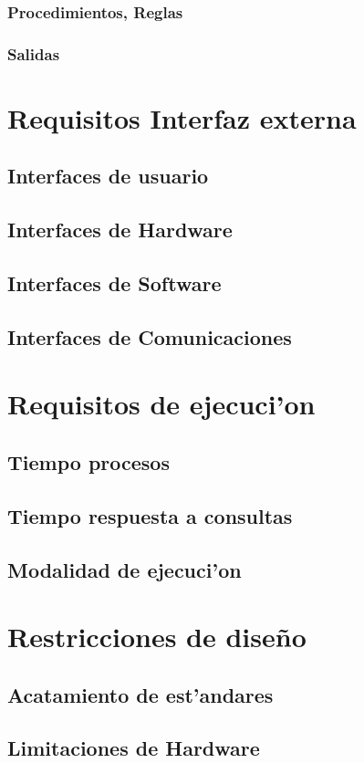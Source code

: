 \documentclass[letterpaper,openright,10pt,oneside]{report}
\begin{document}
				\subsubsection{Procedimientos, Reglas}
				\subsubsection{Salidas}
		\section{Requisitos Interfaz externa}
			\subsection{Interfaces de usuario}
			\subsection{Interfaces de Hardware}
			\subsection{Interfaces de Software}
			\subsection{Interfaces de Comunicaciones}
		\section{Requisitos de ejecuci'on}
			\subsection{Tiempo procesos}
			\subsection{Tiempo respuesta a consultas}
			\subsection{Modalidad de ejecuci'on}
		\section{Restricciones de diseño}
			\subsection{Acatamiento de est'andares}
			\subsection{Limitaciones de Hardware}
\end{document}
